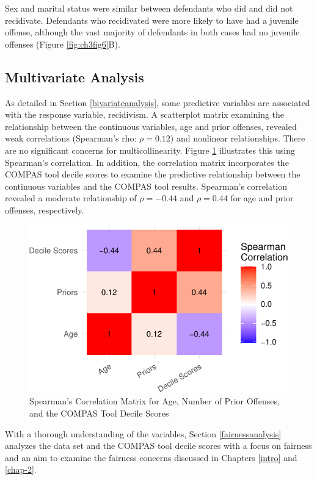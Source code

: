 \documentclass[12pt, twoside]{amherstthesis}
\begin{document}
Sex and marital status were similar between defendants who did and did not recidivate. Defendants who recidivated were more likely to have had a juvenile offense, although the vast majority of defendants in both cases had no juvenile offenses (Figure \ref{fig:ch3fig6}B).

\hypertarget{multivariate-analysis}{%
\subsection{Multivariate Analysis}\label{multivariate-analysis}}

As detailed in Section \ref{bivariateanalysis}, some predictive variables are associated with the response variable, recidivism. A scatterplot matrix examining the relationship between the continuous variables, age and prior offenses, revealed weak correlations (Spearman's rho: \(\rho = 0.12\)) and nonlinear relationships. There are no significant concerns for multicollinearity. Figure \ref{fig:ch3fig7} illustrates this using Spearman's correlation. In addition, the correlation matrix incorporates the COMPAS tool decile scores to examine the predictive relationship between the continuous variables and the COMPAS tool results. Spearman's correlation revealed a moderate relationship of \(\rho = -0.44\) and \(\rho = 0.44\) for age and prior offenses, respectively.
\begin{figure}

{\centering \includegraphics{Dasha-Asienga_StatThesis_files/figure-latex/ch3fig7-1} 

}

\caption{Spearman's Correlation Matrix for Age, Number of Prior Offenses, and the COMPAS Tool Decile Scores}\label{fig:ch3fig7}
\end{figure}
With a thorough understanding of the variables, Section \ref{fairnessanalysis} analyzes the data set and the COMPAS tool decile scores with a focus on fairness and an aim to examine the fairness concerns discussed in Chapters \ref{intro} and \ref{chap-2}.
\end{document}

